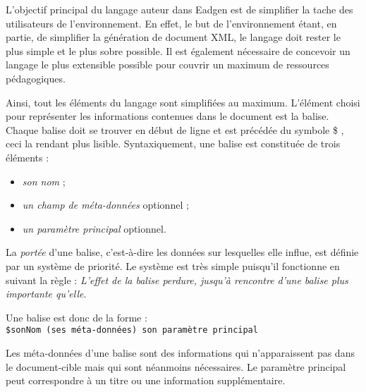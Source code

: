 L'objectif principal du langage auteur dans Eadgen est de simplifier
la tache des utilisateurs de l'environnement. En effet, le but de 
l'environnement étant, en partie, de simplifier la génération de document
XML, le langage doit rester le plus simple et le plus sobre possible. Il 
est également nécessaire de concevoir un langage le plus extensible possible
pour couvrir un maximum de ressources pédagogiques. 

Ainsi, tout les éléments du langage sont simplifiées au maximum. L'élément 
choisi pour représenter les informations contenues dans le document est 
la balise. Chaque balise doit se trouver en début de ligne et est précédée
du symbole \og \$ \fg, ceci la rendant plus lisible. Syntaxiquement, une 
balise est constituée de trois éléments : 
\begin{itemize}
	\item \emph{son nom} ;
	\item \emph{un champ de méta-données} optionnel ; 
	\item \emph{un paramètre principal} optionnel.
\end{itemize}
La \emph{portée} d'une balise, c'est-à-dire les données sur lesquelles
elle influe, est définie par un système de priorité. Le système est très 
simple puisqu'il fonctionne en suivant la règle : \emph{L'effet de la 
balise perdure, jusqu'à rencontre d'une balise plus importante qu'elle}.

Une balise est donc de la forme : \\
\texttt{\$sonNom (ses méta-données) son paramètre principal}

Les méta-données d'une balise sont des informations qui n'apparaissent
pas dans le document-cible mais qui sont néanmoins nécessaires. Le paramètre
principal peut correspondre à un titre ou une information supplémentaire.
